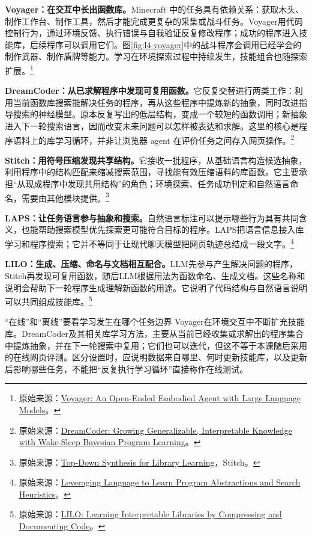 \documentclass[11pt,a4paper]{article}
\begin{document}
\textbf{Voyager：在交互中长出函数库。}Minecraft 中的任务具有依赖关系：获取木头、制作工作台、制作工具，然后才能完成更复杂的采集或战斗任务。Voyager用代码控制行为，通过环境反馈、执行错误与自我验证反复修改程序；成功的程序进入技能库，后续程序可以调用它们。图\ref{fig:l4-voyager}中的战斗程序会调用已经学会的制作武器、制作盾牌等能力。学习在环境探索过程中持续发生，技能组合也随探索扩展。\footnote{原始来源：\href{https://arxiv.org/abs/2305.16291}{Voyager: An Open-Ended Embodied Agent with Large Language Models}。}

\textbf{DreamCoder：从已求解程序中发现可复用函数。}它反复交替进行两类工作：利用当前函数库搜索能解决任务的程序，再从这些程序中提炼新的抽象，同时改进指导搜索的神经模型。原本反复写出的低层结构，变成一个较短的函数调用；新抽象进入下一轮搜索语言，因而改变未来问题可以怎样被表达和求解。这里的核心是程序语料上的库学习循环，并非让浏览器 agent 在评价任务之间存入网页操作。\footnote{原始来源：\href{https://arxiv.org/abs/2006.08381}{DreamCoder: Growing Generalizable, Interpretable Knowledge with Wake-Sleep Bayesian Program Learning}。}

\textbf{Stitch：用符号压缩发现共享结构。}它接收一批程序，从基础语言构造候选抽象，利用程序中的结构匹配来缩减搜索范围，寻找能有效压缩语料的库函数。它主要承担“从现成程序中发现共用结构”的角色；环境探索、任务成功判定和自然语言命名，需要由其他模块提供。\footnote{原始来源：\href{https://arxiv.org/abs/2211.16605}{Top-Down Synthesis for Library Learning}，Stitch。}

\textbf{LAPS：让任务语言参与抽象和搜索。}自然语言标注可以提示哪些行为具有共同含义，也能帮助搜索模型优先探索更可能符合目标的程序。LAPS把语言信息接入库学习和程序搜索；它并不等同于让现代聊天模型把网页轨迹总结成一段文字。\footnote{原始来源：\href{https://arxiv.org/abs/2106.11053}{Leveraging Language to Learn Program Abstractions and Search Heuristics}。}

\textbf{LILO：生成、压缩、命名与文档相互配合。}LLM先参与产生解决问题的程序，Stitch再发现可复用函数，随后LLM根据用法为函数命名、生成文档。这些名称和说明会帮助下一轮程序生成理解新函数的用途。它说明了代码结构与自然语言说明可以共同组成技能库。\footnote{原始来源：\href{https://arxiv.org/abs/2310.19791}{LILO: Learning Interpretable Libraries by Compressing and Documenting Code}。}

\begin{knowledgebox}{“在线”和“离线”要看学习发生在哪个任务边界}
Voyager在环境交互中不断扩充技能库。DreamCoder及其相关库学习方法，主要从当前已经收集或求解出的程序集合中提炼抽象，并在下一轮搜索中复用；它们也可以迭代，但这不等于本课随后采用的在线网页评测。区分设置时，应说明数据来自哪里、何时更新技能库，以及更新后影响哪些任务，不能把“反复执行学习循环”直接称作在线测试。
\end{knowledgebox}
\end{document}
